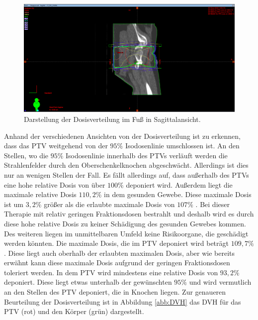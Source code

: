 \begin{figure}[H]
  \centering
  \includegraphics[width=\textwidth]{Bilder/HüfteX.png}
  \caption{Darstellung der Dosisverteilung im Fuß in Sagittalansicht.}
  \label{abb:X}
\end{figure}

Anhand der verschiedenen Ansichten von der Dosisverteilung ist zu erkennen, dass das
PTV weitgehend von der $95\%$ Isodosenlinie umschlossen ist. An den Stellen, wo die $95\%$ Isodosenlinie innerhalb
des PTVs verläuft werden die Strahlenfelder durch den Oberschenkelknochen abgeschwächt. Allerdings ist dies nur an
wenigen Stellen der Fall. Es fällt allerdings auf, dass außerhalb des PTVs eine hohe relative Dosis von über $100\%$ deponiert wird.
Außerdem liegt die maximale relative Dosis $110,2\%$ in dem gesunden Gewebe. Diese maximale Dosis
ist um $3,2\%$ größer als die erlaubte maximale Dosis von $107\%$ \cite{ICRU}. Bei dieser Therapie mit relativ geringen Fraktionsdosen
bestrahlt und deshalb wird es durch diese hohe relative Dosis zu keiner Schädigung des gesunden Gewebes kommen. Des weiteren
liegen im unmittelbaren Umfeld keine Risikoorgane, die geschädigt werden könnten.
Die maximale Dosis, die im PTV deponiert wird beträgt $109,7\%$. Diese liegt auch oberhalb der erlaubten maximalen Dosis, aber
wie bereits erwähnt kann diese maximale Dosis aufgrund der geringen Fraktionsdosen toleriert werden.
In dem PTV wird mindestens eine relative Dosis von $93,2\%$ deponiert. Diese liegt etwas unterhalb der gewünschten $95\%$ und
wird vermutlich an den Stellen des PTV deponiert, die in Knochen liegen.
Zur genaueren Beurteilung der Dosisverteilung ist in Abbildung \ref{abb:DVH} das DVH für das
PTV (rot) und den Körper (grün) dargestellt.


